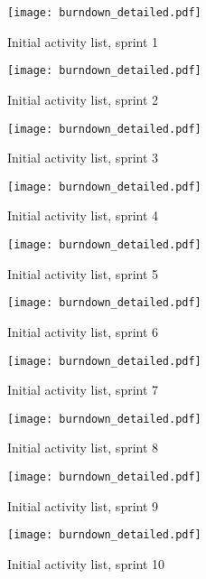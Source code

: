 \begin{figure}[h!]
	\texttt{[image: burndown\_detailed.pdf]}
	\caption{Initial activity list, sprint 1}
	\end{figure}

\begin{figure}[h!]
    \centering
	\texttt{[image: burndown\_detailed.pdf]}
	\caption{Initial activity list, sprint 2}
	\end{figure}


\begin{figure}[h!]
    \centering
	\texttt{[image: burndown\_detailed.pdf]}
	\caption{Initial activity list, sprint 3}
	\end{figure}


\begin{figure}[h!]
    \centering
	\texttt{[image: burndown\_detailed.pdf]}
	\caption{Initial activity list, sprint 4}
	\end{figure}

\begin{figure}[h!]
    \centering
	\texttt{[image: burndown\_detailed.pdf]}
	\caption{Initial activity list, sprint 5}
	\end{figure}


\begin{figure}[h!]
    \centering
	\texttt{[image: burndown\_detailed.pdf]}
	\caption{Initial activity list, sprint 6}
	\end{figure}


\begin{figure}[h!]
    \centering
	\texttt{[image: burndown\_detailed.pdf]}
	\caption{Initial activity list, sprint 7}
	\end{figure}


\begin{figure}[h!]
    \centering
	\texttt{[image: burndown\_detailed.pdf]}
	\caption{Initial activity list, sprint 8}
	\end{figure}


\begin{figure}[h!]
    \centering
	\texttt{[image: burndown\_detailed.pdf]}
	\caption{Initial activity list, sprint 9}
	\end{figure}

\begin{figure}[h!]
    \centering
	\texttt{[image: burndown\_detailed.pdf]}
	\caption{Initial activity list, sprint 10}
	\end{figure}


